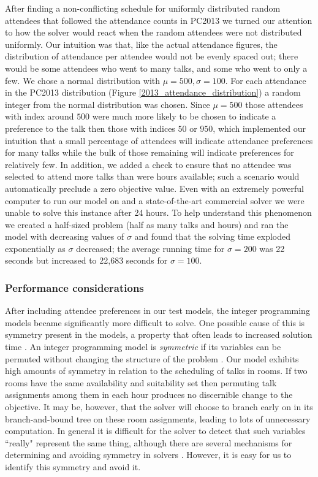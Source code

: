\documentclass{svjour3}                     %
\begin{document}
After finding a non-conflicting schedule for uniformly distributed random attendees that followed the attendance counts in PC2013 we turned our attention to how the solver would react when the random attendees were not distributed uniformly. 
Our intuition was that, like the actual attendance figures, the distribution of attendance per attendee would not be evenly spaced out; there would be some attendees who went to many talks, and some who went to only a few. 
We chose a normal distribution with $\mu = 500, \sigma = 100$. 
For each attendance in the PC2013 distribution (Figure \ref{2013_attendance_distribution}) a random integer from the normal distribution was chosen. 
Since $\mu = 500$ those attendees with index around $500$ were much more likely to be chosen to indicate a preference to the talk then those with indices $50$ or $950$, which implemented our intuition that a small percentage of attendees will indicate attendance preferences for many talks while the bulk of those remaining will indicate preferences for relatively few.
In addition, we added a check to ensure that no attendee was selected to attend more talks than were hours available; such a scenario would automatically preclude a zero objective value.
Even with an extremely powerful computer to run our model on and a state-of-the-art commercial solver we were unable to solve this instance after 24 hours. 
To help understand this phenomenon we created a half-sized problem (half as many talks and hours) and ran the model with decreasing values of $\sigma$ and found that the solving time exploded exponentially as $\sigma$ decreased; the average running time for $\sigma = 200$ was 22 seconds but increased to 22,683 seconds for $\sigma = 100$.

\subsubsection{Performance considerations}
After including attendee preferences in our test models, the integer programming models became significantly more difficult to solve.
One possible cause of this is symmetry present in the models, a property that often leads to increased solution time \cite{sherali}.
An integer programming model is \emph{symmetric} if its variables can be permuted without changing the structure of the problem \cite{margot}. 
Our model exhibits high amounts of symmetry in relation to the scheduling of talks in rooms. 
If two rooms have the same availability and suitability set then permuting talk assignments among them in each hour produces no discernible change to the objective. 
It may be, however, that the solver will choose to branch early on in its branch-and-bound tree on these room assignments, leading to lots of unnecessary computation. 
In general it is difficult for the solver to detect that such variables ``really" represent the same thing, although there are several mechanisms for  determining and avoiding symmetry in solvers \cite{ostrowski}. 
However, it is easy for us to identify this symmetry and avoid it.
\end{document}
